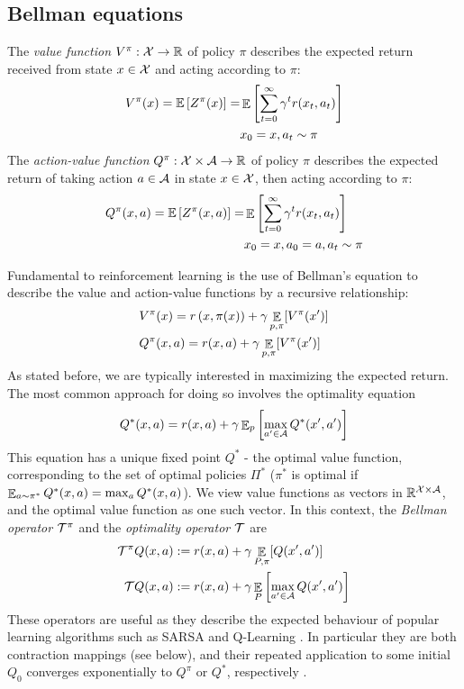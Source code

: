 \subsection{Bellman equations}

The \textit{value function} $V^\pi : \mathcal{X}\to\mathbb{R}$ of policy $\pi$ describes the expected return received from state $x \in \mathcal{X}$ and acting according to $\pi$:
\begin{equation}
\begin{split}
V^\pi(x) = \mathbb{E}\left[ { Z^\pi(x)} \right] =& \mathop{\mathbb{E}}\left[\sum_{t=0}^\infty \gamma^tr(x_t,a_t) \right]\\
&x_0 = x, a_t \sim \pi
\end{split}
\end{equation}
The \textit{action-value function} $Q^\pi : \mathcal{X}\times\mathcal{A}\to\mathbb{R}$ of policy $\pi$ describes the expected return of taking action $a \in \mathcal{A}$ in state $x \in \mathcal{X}$, then acting according to $\pi$:
\begin{equation}
\begin{split}
Q^\pi(x, a) = \mathbb{E}\left[ {Z^\pi(x, a)} \right] =& \mathop{\mathbb{E}}\left[ \sum_{t=0}^\infty \gamma^tr(x_t,a_t) \right]\\
&x_0 = x, a_0 = a, a_t \sim \pi
\end{split}
\end{equation}

Fundamental to reinforcement learning is the use of Bellman's equation \citep{bellman1957markovian} to describe the value and action-value functions by a recursive relationship:
\begin{align}
&V^\pi(x) = r\left(x, \pi(x)\right) + \gamma \mathop{\mathbb{E}}\limits_{p, \pi}[ V^\pi(x')]\\
&Q^\pi(x, a) = r(x, a) + \gamma \mathop{\mathbb{E}}_{p, \pi}[ V^\pi(x')]
\end{align}
As stated before, we are typically interested in maximizing the expected return. The most common approach for doing so involves the optimality equation
\begin{equation}\label{eqn:q}
Q^*(x,a) = r(x,a) + \gamma \mathop{\mathbb{E}}\nolimits_p \left[ {\max_{a' \in \mathcal{A}} Q^*(x', a')} \right]
\end{equation}
This equation has a unique fixed point $Q^*$ -  the optimal value function, corresponding to the set of optimal policies $\Pi^*$ ($\pi^*$ is optimal if $\mathop{\mathbb{E}}_{a \sim \pi^*} Q^*(x, a) = \max_a Q^*(x,a)$).
We view value functions as vectors in $\mathbb{R}^{\mathcal{X} \times \mathcal{A}}$, and the optimal value function as one such vector. In this context, the \emph{Bellman operator} $\mathcal{T}^\pi$ and the \emph{optimality operator} $\mathcal{T}$ are
\begin{align}
\mathcal{T}^\pi Q(x,a) &:= r(x, a) + \gamma \mathop{\mathbb{E}}_{P, \pi} [Q(x',a')]\\
\mathcal{T} Q(x,a) &:= r(x, a) + \gamma \mathop{\mathbb{E}}_{P} \left[ {\max_{a' \in \mathcal{A}}Q(x', a')} \right]\label{eqn:bellmanoptimalityoperator}
\end{align}
These operators are useful as they describe the expected behaviour of popular learning algorithms such as SARSA and Q-Learning \cite{sutton1998reinforcement}. In particular they are both contraction mappings (see below), and their repeated application to some initial $Q_0$ converges exponentially to $Q^\pi$ or $Q^*$, respectively \citep{bertsekas1995neuro}.


